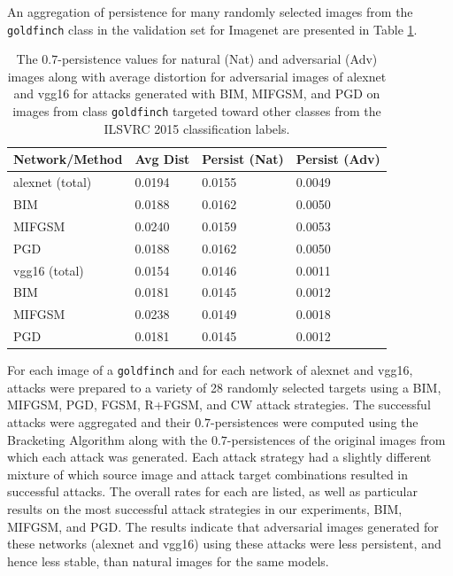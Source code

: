 An aggregation of persistence for many randomly selected images from the \texttt{goldfinch} class in the validation set for Imagenet are presented in Table \ref{TAB:PersistenceAlexVGG}. 
\begin{table}[!ht]
\centering

\begin{tabular}{llll}
\toprule
Network/Method & Avg Dist & Persist (Nat) & Persist (Adv) \\
\midrule
alexnet (total) & 0.0194 & 0.0155 & 0.0049 \\ 
\:\: BIM        & 0.0188 & 0.0162 & 0.0050 \\ 
\:\: MIFGSM     & 0.0240 & 0.0159 & 0.0053 \\ 
\:\: PGD        & 0.0188 & 0.0162 & 0.0050 \\ 
\midrule
vgg16   (total) & 0.0154 & 0.0146 & 0.0011 \\ 
\:\: BIM        & 0.0181 & 0.0145 & 0.0012 \\ 
\:\: MIFGSM     & 0.0238 & 0.0149 & 0.0018 \\ 
\:\: PGD        & 0.0181 & 0.0145 & 0.0012 \\ 
\bottomrule
\end{tabular}
\caption{The $0.7$-persistence values for natural (Nat) and
  adversarial (Adv) images along with average distortion for
  adversarial images of alexnet and vgg16 for attacks generated with
  BIM, MIFGSM, and PGD on images from class \texttt{goldfinch}
  targeted toward other classes from the ILSVRC 2015 classification
  labels.} \label{TAB:PersistenceAlexVGG}%
\end{table}
For each image of a \texttt{goldfinch} and for each network of alexnet and vgg16, attacks were prepared to a variety of 28 randomly selected targets using a BIM, MIFGSM, PGD, FGSM, R+FGSM, and CW attack strategies. The successful attacks were aggregated and their $0.7$-persistences were computed using the Bracketing Algorithm along with the $0.7$-persistences of the original images from which each attack was generated. Each attack strategy had a slightly different mixture of which source image and attack target combinations resulted in successful attacks. The overall rates for each are listed, as well as particular results on the most successful attack strategies in our experiments, BIM, MIFGSM, and PGD. The results indicate that adversarial images generated for these networks (alexnet and vgg16) using these attacks were less persistent, and hence less stable, than natural images for the same models. 

